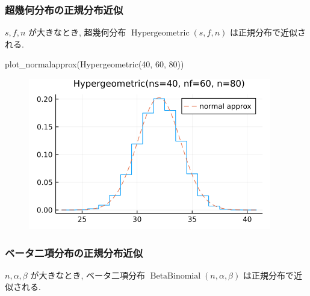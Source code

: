 \documentclass[
  letterpaper,
  DIV=11,
  numbers=noendperiod]{scrartcl}
\newenvironment{Shaded}{\begin{snugshade}}{\end{snugshade}}
\newcommand{\FloatTok}[1]{\textcolor[rgb]{0.68,0.00,0.00}{#1}}
\newcommand{\FunctionTok}[1]{\textcolor[rgb]{0.28,0.35,0.67}{#1}}
\newcommand{\NormalTok}[1]{\textcolor[rgb]{0.00,0.23,0.31}{#1}}
\begin{document}
\hypertarget{ux8d85ux5e7eux4f55ux5206ux5e03ux306eux6b63ux898fux5206ux5e03ux8fd1ux4f3c}{%
\subsubsection{超幾何分布の正規分布近似}\label{ux8d85ux5e7eux4f55ux5206ux5e03ux306eux6b63ux898fux5206ux5e03ux8fd1ux4f3c}}

\(s,f,n\) が大きなとき, 超幾何分布
\(\operatorname{Hypergeometric}(s, f, n)\) は正規分布で近似される.

\begin{Shaded}
\begin{Highlighting}[]
\FunctionTok{plot\_normalapprox}\NormalTok{(}\FunctionTok{Hypergeometric}\NormalTok{(}\FloatTok{40}\NormalTok{, }\FloatTok{60}\NormalTok{, }\FloatTok{80}\NormalTok{))}
\end{Highlighting}
\end{Shaded}

\begin{figure}[H]

{\centering \includegraphics{05 Central limit theorem_files/figure-pdf/cell-129-output-1.png}

}

\end{figure}

\hypertarget{ux30d9ux30fcux30bfux4e8cux9805ux5206ux5e03ux306eux6b63ux898fux5206ux5e03ux8fd1ux4f3c}{%
\subsubsection{ベータ二項分布の正規分布近似}\label{ux30d9ux30fcux30bfux4e8cux9805ux5206ux5e03ux306eux6b63ux898fux5206ux5e03ux8fd1ux4f3c}}

\(n, \alpha, \beta\) が大きなとき, ベータ二項分布
\(\operatorname{BetaBinomial}(n, \alpha, \beta)\)
は正規分布で近似される.
\end{document}

